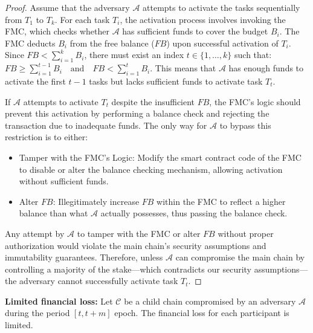 \documentclass[10pt,journal]{IEEEtran}
\begin{document}
\begin{proof}

    Assume that the adversary $\mathcal{A}$ attempts to activate the tasks sequentially from $T_1$ to $T_k$. For each task $T_i$, the activation process involves invoking the FMC, which checks whether $\mathcal{A}$ has sufficient funds to cover the budget $B_i$. The FMC deducts $B_i$ from the free balance ($FB$) upon successful activation of $T_i$. Since $FB < \sum_{i=1}^k B_i$, there must exist an index $t \in \{1, \dots, k\}$ such that: $FB \geq \sum_{i=1}^{t-1} B_i \quad \text{and} \quad FB < \sum_{i=1}^t B_i.$ This means that $\mathcal{A}$ has enough funds to activate the first $t-1$ tasks but lacks sufficient funds to activate task $T_t$.

    If $\mathcal{A}$ attempts to activate $T_t$ despite the insufficient $FB$, the FMC's logic should prevent this activation by performing a balance check and rejecting the transaction due to inadequate funds. The only way for $\mathcal{A}$ to bypass this restriction is to either:
    \begin{itemize}
        \item Tamper with the FMC's Logic: Modify the smart contract code of the FMC to disable or alter the balance checking mechanism, allowing activation without sufficient funds.
        \item Alter $FB$: Illegitimately increase $FB$ within the FMC to reflect a higher balance than what $\mathcal{A}$ actually possesses, thus passing the balance check.
    \end{itemize}

Any attempt by $\mathcal{A}$ to tamper with the FMC or alter $FB$ without proper authorization would violate the main chain's security assumptions and immutability guarantees. Therefore, unless $\mathcal{A}$ can compromise the main chain by controlling a majority of the stake—which contradicts our security assumptions—the adversary cannot successfully activate task $T_t$.

\end{proof}

\noindent\textbf{Limited financial loss:}
    Let $\mathcal{C}$ be a child chain compromised by an adversary $\mathcal{A}$ during the period $[t, t + m ]$ epoch. 
    {\color{blue}
    The financial loss for each participant is limited. 
    } %
 
\end{document}
